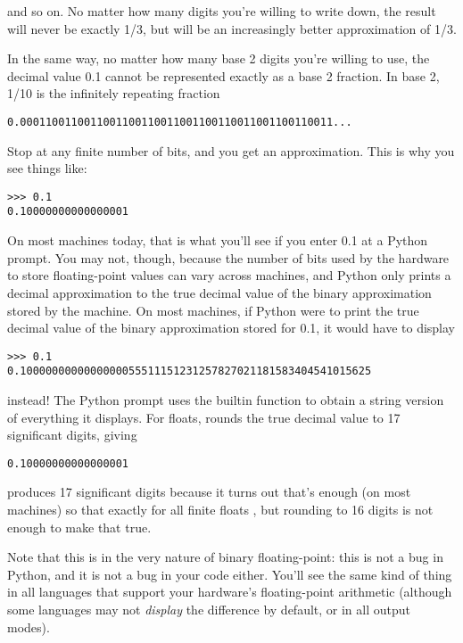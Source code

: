 \documentclass{manual}
\begin{document}
and so on.  No matter how many digits you're willing to write down, the
result will never be exactly 1/3, but will be an increasingly better
approximation of 1/3.

In the same way, no matter how many base 2 digits you're willing to
use, the decimal value 0.1 cannot be represented exactly as a base 2
fraction.  In base 2, 1/10 is the infinitely repeating fraction

\begin{verbatim}
0.0001100110011001100110011001100110011001100110011...
\end{verbatim}

Stop at any finite number of bits, and you get an approximation.  This
is why you see things like:

\begin{verbatim}
>>> 0.1
0.10000000000000001
\end{verbatim}

On most machines today, that is what you'll see if you enter 0.1 at
a Python prompt.  You may not, though, because the number of bits
used by the hardware to store floating-point values can vary across
machines, and Python only prints a decimal approximation to the true
decimal value of the binary approximation stored by the machine.  On
most machines, if Python were to print the true decimal value of
the binary approximation stored for 0.1, it would have to display

\begin{verbatim}
>>> 0.1
0.1000000000000000055511151231257827021181583404541015625
\end{verbatim}

instead!  The Python prompt uses the builtin
 function to obtain a string version of everything it
displays.  For floats,  rounds the true
decimal value to 17 significant digits, giving

\begin{verbatim}
0.10000000000000001
\end{verbatim}

 produces 17 significant digits because it
turns out that's enough (on most machines) so that
 exactly for all finite floats
, but rounding to 16 digits is not enough to make that true.

Note that this is in the very nature of binary floating-point: this is
not a bug in Python, and it is not a bug in your code either.  You'll
see the same kind of thing in all languages that support your
hardware's floating-point arithmetic (although some languages may
not \emph{display} the difference by default, or in all output modes).
\end{document}
